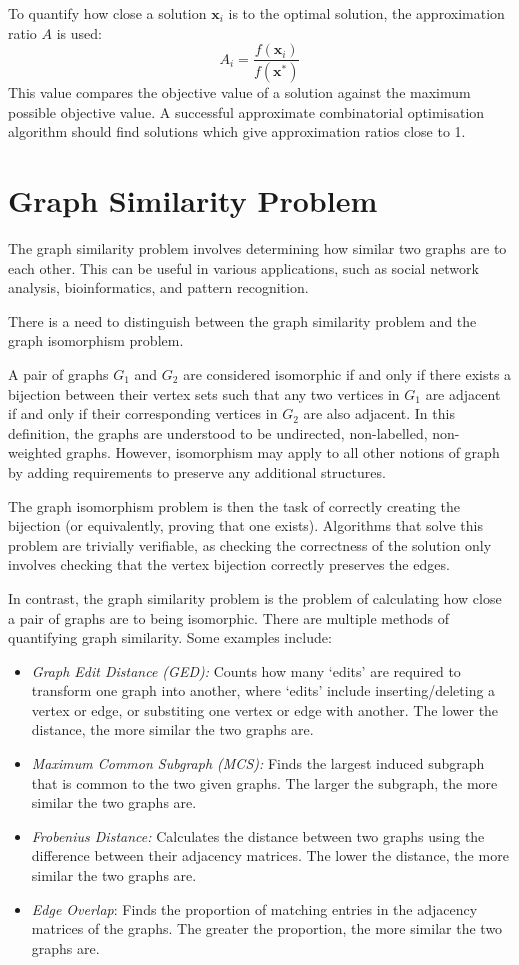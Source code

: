 To quantify how close a solution $\mathbf{x}_i$ is to the optimal solution, the approximation ratio $A$ is used:
$$A_i = \frac{f(\mathbf{x}_i)}{f(\mathbf{x}^*)}$$
This value compares the objective value of a solution against the maximum possible objective value. A successful approximate combinatorial optimisation algorithm should find solutions which give approximation ratios close to 1.

\section{Graph Similarity Problem}\label{graph_sim_section}
The graph similarity problem involves determining how similar two graphs are to each other. This can be useful in various applications, such as social network analysis, bioinformatics, and pattern recognition. 

There is a need to distinguish between the graph similarity problem and the graph isomorphism problem.

A pair of graphs $G_1$ and $G_2$ are considered isomorphic if and only if there exists a bijection between their vertex sets such that any two vertices in $G_1$ are adjacent if and only if their corresponding vertices in $G_2$ are also adjacent. In this definition, the graphs are understood to be undirected, non-labelled, non-weighted graphs. However, isomorphism may apply to all other notions of graph by adding requirements to preserve any additional structures.

The graph isomorphism problem is then the task of correctly creating the bijection (or equivalently, proving that one exists). Algorithms that solve this problem are trivially verifiable, as checking the correctness of the solution only involves checking that the vertex bijection correctly preserves the edges.

In contrast, the graph similarity problem is the problem of calculating how close a pair of graphs are to being isomorphic. There are multiple methods of quantifying graph similarity. Some examples include:
\begin{itemize}
    \item \textit{Graph Edit Distance (GED):} Counts how many `edits' are required to transform one graph into another, where `edits' include inserting/deleting a vertex or edge, or substiting one vertex or edge with another. The lower the distance, the more similar the two graphs are.
    \item \textit{Maximum Common Subgraph (MCS):} Finds the largest induced subgraph that is common to the two given graphs. The larger the subgraph, the more similar the two graphs are.
    \item \textit{Frobenius Distance:} Calculates the distance between two graphs using the difference between their adjacency matrices. The lower the distance, the more similar the two graphs are.
    \item \textit{Edge Overlap}: Finds the proportion of matching entries in the adjacency matrices of the graphs. The greater the proportion, the more similar the two graphs are.
\end{itemize}

